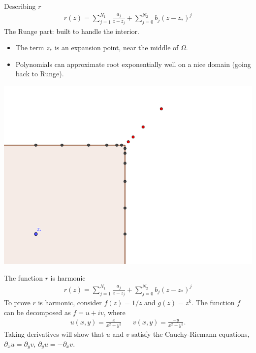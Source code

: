 \documentclass{seminar}
\begin{document}
\begin{slide} %
\large Describing $r$
\small
\begin{align*}
r(z)= \sum_{j=1}^{N_1} \frac{a_j}{z-z_j} + \sum_{j=0}^{N_2} b_j (z-z_*)^j
\end{align*}
The Runge part: built to handle the interior.
\begin{multicols}{2}
\begin{itemize}
	\item The term $z_*$ is an expansion point, near the middle of $\Omega$.
	\item Polynomials can approximate root exponentially well on a nice domain (going back to Runge).
\end{itemize}
\includegraphics[scale=4]{./PNG/corner_nodes_illust}
\end{multicols}
\end{slide} %




\begin{slide} %
\large The function $r$ is harmonic 
\small
\begin{align*}
r(z)= \sum_{j=1}^{N_1} \frac{a_j}{z-z_j} + \sum_{j=0}^{N_2} b_j (z-z_*)^j
\end{align*}
To prove $r$ is harmonic, consider $f(z)=1/z$ and $g(z)=z^k$.
The function $f$ can be decomposed as $f=u+iv$, where
\begin{align*}
u(x,y)=\frac{x}{x^2+y^2} &&
v(x,y)=\frac{-y}{x^2+y^2}.
\end{align*}
Taking derivatives will show that $u$ and $v$ satisfy the Cauchy-Riemann equations, ${\partial}_x u={\partial}_y v$, ${\partial}_y u=-{\partial}_x v$.
\end{slide} %
\end{document}
